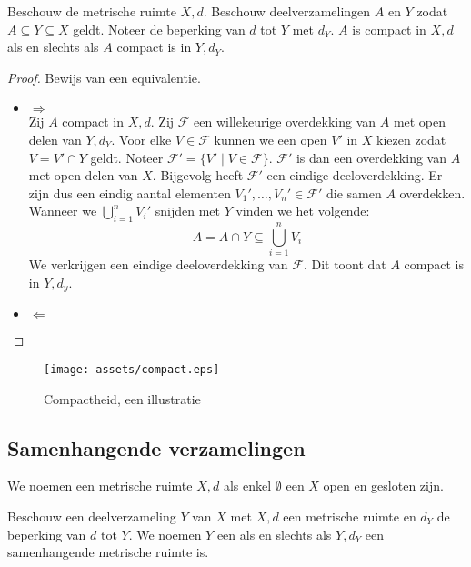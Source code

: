 \documentclass[main.tex]{subfiles}
\begin{document}
\begin{bpr}
  Beschouw de metrische ruimte $X,d$.
  Beschouw deelverzamelingen $A$ en $Y$ zodat $A \subseteq Y \subseteq X$ geldt.
  Noteer de beperking van $d$ tot $Y$ met $d_{Y}$.
  $A$ is compact in $X,d$ als en slechts als $A$ compact is in $Y,d_{Y}$.

  \begin{proof}
    Bewijs van een equivalentie.
    \begin{itemize}
    \item $\Rightarrow$\\
      Zij $A$ compact in $X,d$.
      Zij $\mathcal{F}$ een willekeurige overdekking van $A$ met open delen van $Y,d_{Y}$.
      Voor elke $V\in \mathcal{F}$ kunnen we een open $V'$ in $X$ kiezen zodat $V = V'\cap Y$ geldt.
      Noteer $\mathcal{F}' = \{ V' \mid V \in \mathcal{F}\}$.
      $\mathcal{F}'$ is dan een overdekking van $A$ met open delen van $X$.
      Bijgevolg heeft $\mathcal{F}'$ een eindige deeloverdekking.
      Er zijn dus een eindig aantal elementen $V_{1}',\dotsc,V_{n}' \in \mathcal{F}'$ die samen $A$ overdekken.
      Wanneer we $\bigcup_{i=1}^{n}V_{i}'$ snijden met $Y$ vinden we het volgende:
      \[ A = A \cap Y \subseteq \bigcup_{i=1}^{n}V_{i} \]
      We verkrijgen een eindige deeloverdekking van $\mathcal{F}$.
      Dit toont dat $A$ compact is in $Y,d_{y}$.
    \item $\Leftarrow$\\
    \end{itemize}
  \end{proof}
\end{bpr}

\begin{figure}[H]
  \centering
  \texttt{[image: assets/compact.eps]}
  \caption{Compactheid, een illustratie}
  \label{fig:compactheid}
\end{figure}

\subsection{Samenhangende verzamelingen}
\label{sec:samenh-verz}

\begin{de}
  We noemen een metrische ruimte $X,d$  als enkel $\emptyset$ een $X$ open en gesloten zijn.
\end{de}

\begin{de}
  Beschouw een deelverzameling $Y$ van $X$ met $X,d$ een metrische ruimte en $d_{Y}$ de beperking van $d$ tot $Y$.
  We noemen $Y$ een  als en slechts als $Y,d_{Y}$ een samenhangende metrische ruimte is.
\end{de}
 
\end{document}
